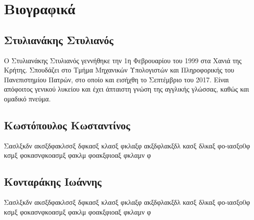 \documentclass{article}
\begin{document}
\section{Βιογραφικά}
\subsection*{Στυλιανάκης Στυλιανός}
Ο Στυλιανάκης Στυλιανός γεννήθηκε την 1η Φεβρουαρίου του 1999 στα Χανιά της Κρήτης. Σπουδάζει στο Τμήμα Μηχανικών Υπολογιστών και Πληροφορικής του Πανεπιστημίου Πατρών, στο οποίο και εισήχθη το Σεπτέμβριο του 2017. Είναι απόφοιτος γενικού λυκείου και έχει άπταιστη γνώση της αγγλικής γλώσσας, καθώς και ομαδικό πνεύμα.
\subsection*{Κωστόπουλος Κωσταντίνος}
Σασλξκδν ακσξδφακλσσξ δφκασξ κλασξ φκλαξφ ακξδφλακξδλ κασξ δλκαξ φο-ιασξο0φ κσμξ φοκασνφκοασμξ φακλμ φοακξφιοαξ φκλαμν φ
\subsection*{Κονταράκης Ιωάννης}
Σασλξκδν ακσξδφακλσσξ δφκασξ κλασξ φκλαξφ ακξδφλακξδλ κασξ δλκαξ φο-ιασξο0φ κσμξ φοκασνφκοασμξ φακλμ φοακξφιοαξ φκλαμν φ
\end{document}
